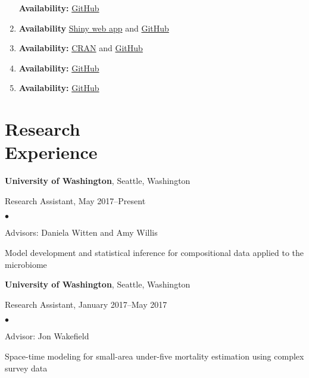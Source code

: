 \documentclass[margin,centered]{res}
\newenvironment{list1}{
  \begin{list}{\ding{113}}{%
      \setlength{\itemsep}{0in}
      \setlength{\parsep}{0in} \setlength{\parskip}{0in}
      \setlength{\topsep}{0in} \setlength{\partopsep}{0in}
      \setlength{\leftmargin}{0.17in}}}{\end{list}}
\newenvironment{list2}{
  \begin{list}{$\bullet$}{%
      \setlength{\itemsep}{0in}
      \setlength{\parsep}{0in} \setlength{\parskip}{0in}
      \setlength{\topsep}{0in} \setlength{\partopsep}{0in}
      \setlength{\leftmargin}{0.2in}}}{\end{list}}
\begin{document}
\begin{resume}
\begin{enumerate}[leftmargin=*]
\textbf{Availability:}
\href{https://github.com/bryandmartin/corncob}{GitHub}

\item {}

\textbf{Availability}
\href{https://serrat839.shinyapps.io/mRkov_shiny/}{Shiny web app} and \href{https://github.com/serrate839/mRkov}{GitHub}

    \item {}
    
    \textbf{Availability:} \href{https://CRAN.R-project.org/package=SUMMER}{CRAN} and \href{https://github.com/bryandmartin/SUMMER}{GitHub}
    \item {}
    
    \textbf{Availability:} \href{https://github.com/adw96/DivNet}{GitHub}
    
    \item {}
    
    \textbf{Availability:}
    \href{https://github.com/adw96/breakaway}{GitHub}
\end{enumerate}



\section{\sc Research\\ Experience}
{\bf University of Washington},  Seattle, Washington
\begin{list1}
\item[] 
Research Assistant, May 2017--Present
\begin{list2}
\vspace*{.05in}
\item Advisors: Daniela Witten and Amy Willis
\item Model development and statistical inference for compositional data applied to the microbiome
\end{list2} 
\end{list1}


{\bf University of Washington},  Seattle, Washington
\begin{list1}
\item[] 
Research Assistant, January 2017--May 2017
\begin{list2}
\vspace*{.05in}
\item Advisor: Jon Wakefield
\item Space-time modeling for  small-area under-five mortality estimation using complex survey data
\end{list2} 
\end{list1}


\end{resume}
\end{document}
